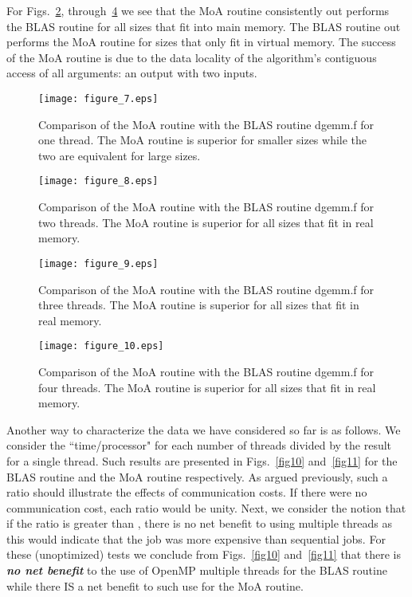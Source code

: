 \documentclass[aps,prl,twocolumn,groupedaddress,floatfix]{revtex4}
\begin{document}
For Figs.~\ref{fig7}, through~\ref{fig9} we see that the MoA routine 
consistently out performs the BLAS routine for all sizes that fit 
into main memory.  The BLAS routine out performs the MoA routine for sizes
that only fit in virtual memory.  The success of the MoA routine is due to
the data locality of the algorithm's contiguous 
access of all arguments: an output with two inputs.

\begin{figure} 
\texttt{[image: figure\_7.eps]}\caption{\label{fig6} Comparison of the MoA routine with the BLAS routine
dgemm.f for one thread. The MoA routine is superior for smaller sizes
while the two are equivalent for large sizes.
}
\end{figure}

\begin{figure}
\texttt{[image: figure\_8.eps]}\caption{\label{fig7} Comparison of the MoA routine with the BLAS routine
dgemm.f for two threads. The MoA routine is superior for all sizes
that fit in real memory.
}
\end{figure}

\begin{figure} 
\texttt{[image: figure\_9.eps]}\caption{\label{fig8} Comparison of the MoA routine with the BLAS routine
dgemm.f for three threads. The MoA routine is superior for all sizes
that fit in real memory.
}
\end{figure}

\begin{figure} 
\texttt{[image: figure\_10.eps]}\caption{\label{fig9} Comparison of the MoA routine with the BLAS routine
dgemm.f for four threads. The MoA routine is superior for all sizes
that fit in real memory.
}
\end{figure}

Another way to characterize the data we have considered so far is as 
follows.  We consider the ``time/processor" for each number of threads
 divided by the result for a single thread.  Such results are
presented in Figs.~\ref{fig10} and~\ref{fig11} for the BLAS routine
and the MoA routine respectively.  As argued previously, such a ratio
should illustrate the effects of communication costs.  If there were
no communication cost, each ratio would be unity.  Next, we consider
the notion that if the ratio is greater than , there is no net benefit
to using multiple threads as this would indicate that the job was more
expensive than  sequential jobs.  For these (unoptimized) tests we
conclude from Figs.~\ref{fig10} and~\ref{fig11} that there is {\bf \em
 no net benefit} to the use of OpenMP multiple threads for the BLAS
routine while there IS a net benefit to such use for the MoA routine.
\end{document}
